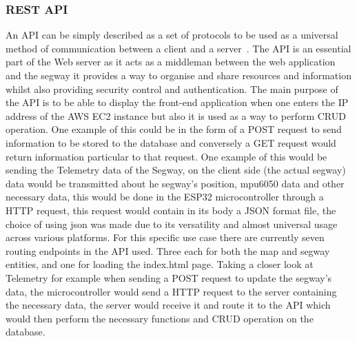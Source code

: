 \subsubsection{REST API}
An API can be simply described as a set of protocols to be used as a universal method of communication between a client and a server~\cite{ref:restapi}. The API is an essential part of the Web server as it acts as a middleman between the web application and the segway it provides a way to organise and share resources and information whilst also providing security control and authentication. 
The main purpose of the API is to be able to display the front-end application when one enters the IP address of the AWS EC2 instance but also it is used as a way to perform CRUD operation. One example of this could be in the form of a POST request to send information to be stored to the database and conversely a GET request would return information particular to that request. One example of this would be sending the Telemetry data of the Segway, on the client side (the actual segway) data would be transmitted about he segway’s position, mpu6050 data and other necessary data, this would be done in the ESP32 microcontroller through a HTTP request, this request would contain in its body a JSON format file, the choice of using json was made due to its versatility and almost universal usage across various platforms.
For this specific use case there are currently seven routing endpoints in the API used. Three each for both the map and segway entities, and one for loading the index.html page. Taking a closer look at Telemetry for example when sending a POST request to update the segway’s data, the microcontroller would send a HTTP request to the server containing the necessary data, the server would receive it and route it to the API which would then perform the necessary functions and CRUD operation on the database.

